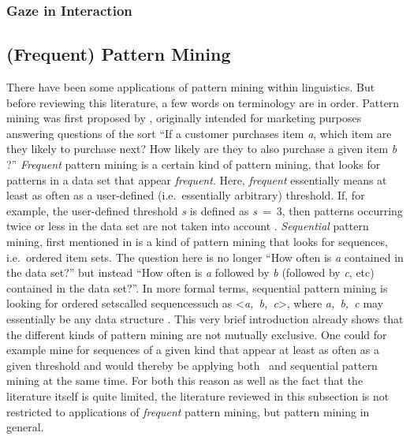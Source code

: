 \subsubsection{Gaze in Interaction}


\subsection{(Frequent) Pattern Mining}
\label{sec:introductionresearchfpm}
There have been some applications of pattern mining within linguistics.
But before reviewing this literature, a few words on terminology are in order.
Pattern mining was first proposed by \citet{agrawal_mining_1993}, originally intended for marketing purposes answering questions of the sort
``If a customer purchases item \emph{a}, which item are they likely to purchase next?
How likely are they to also purchase a given item \emph{b} \citep[]{han_frequent_2007}?''
\emph{Frequent} pattern mining is a certain kind of pattern mining, that looks for patterns in a data set that appear \emph{frequent}.
Here, \emph{frequent} essentially means at least as often as a user-defined (i.e.~essentially arbitrary) threshold.
If, for example, the user-defined threshold \emph{s} is defined as \emph{s}~=~3, then patterns occurring twice or less in the data set are not taken into account \citep[]{han_data_2012}.
\emph{Sequential} pattern mining, first mentioned in \citet{agrawal_mining_1995} is a kind of pattern mining that looks for sequences, i.e.~ordered item sets.
The question here is no longer ``How often is \emph{a} contained in the data set?'' but instead ``How often is \emph{a} followed by \emph{b} (followed by \emph{c}, etc) contained in the data set?''.
In more formal terms, sequential pattern mining is looking for ordered sets\dash called sequences\dash such as <\emph{a,~b,~c}>, where \emph{a,~b,~c} may essentially be any data structure \citep[]{han_frequent_2007}.
This very brief introduction already shows that the different kinds of pattern mining are not mutually exclusive.
One could for example mine for sequences of a given kind that appear at least as often as a given threshold and would thereby be applying both \fpmlower\ and sequential pattern mining at the same time.
For both this reason as well as the fact that the literature itself is quite limited, the literature reviewed in this subsection is not restricted to applications of \emph{frequent} pattern mining, but pattern mining in general.

